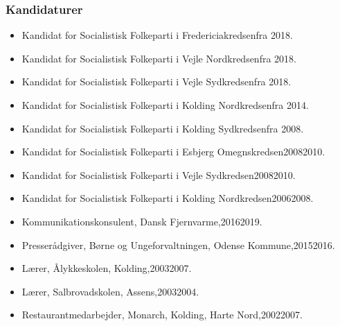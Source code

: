 \documentclass[11pt, a4paper]{awesome-cv}
\begin{document}
\begin{cvletter}
\subsubsection*{Kandidaturer}
\begin{itemize}
\item Kandidat for Socialistisk Folkeparti i Fredericiakredsenfra 2018.
\item Kandidat for Socialistisk Folkeparti i Vejle Nordkredsenfra 2018.
\item Kandidat for Socialistisk Folkeparti i Vejle Sydkredsenfra 2018.
\item Kandidat for Socialistisk Folkeparti i Kolding Nordkredsenfra 2014.
\item Kandidat for Socialistisk Folkeparti i Kolding Sydkredsenfra 2008.
\item Kandidat for Socialistisk Folkeparti i Esbjerg Omegnskredsen20082010.
\item Kandidat for Socialistisk Folkeparti i Vejle Sydkredsen20082010.
\item Kandidat for Socialistisk Folkeparti i Kolding Nordkredsen20062008.
\end{itemize}
\begin{itemize}
\item Kommunikationskonsulent, Dansk Fjernvarme,20162019.
\item Presserådgiver, Børne og Ungeforvaltningen, Odense Kommune,20152016.
\item Lærer, Ålykkeskolen, Kolding,20032007.
\item Lærer, Salbrovadskolen, Assens,20032004.
\item Restaurantmedarbejder, Monarch, Kolding, Harte Nord,20022007.
\end{itemize}
\end{cvletter}
\end{document}
